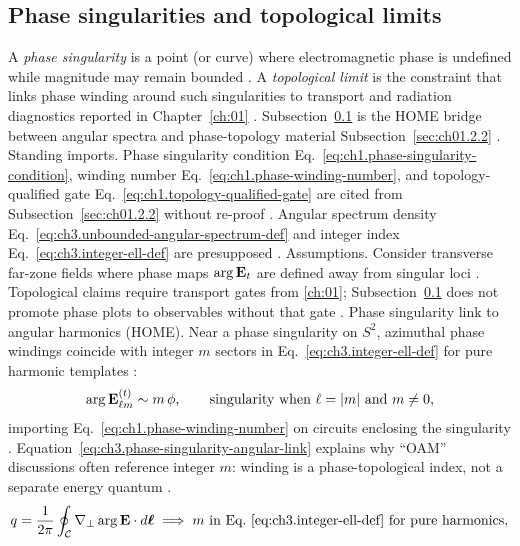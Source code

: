 \subsection{Phase singularities and topological limits}
\label{sec:ch374}
A \emph{phase singularity} is a point (or curve) where electromagnetic phase is undefined while magnitude may remain
bounded \cite{allen1992}. A \emph{topological limit} is the constraint that links phase winding
around such singularities to transport and radiation diagnostics reported in Chapter~\ref{ch:01}
\cite{stratton1941}. Subsection~\ref{sec:ch374} is the HOME bridge between angular spectra and
phase-topology material Subsection~\ref{sec:ch01.2.2} \cite{allen1992}.
Standing imports. Phase singularity condition Eq.~\eqref{eq:ch1.phase-singularity-condition}, winding number
Eq.~\eqref{eq:ch1.phase-winding-number}, and topology-qualified gate Eq.~\eqref{eq:ch1.topology-qualified-gate} are
cited from Subsection~\ref{sec:ch01.2.2} without re-proof \cite{stratton1941}. Angular spectrum density
Eq.~\eqref{eq:ch3.unbounded-angular-spectrum-def} and integer index Eq.~\eqref{eq:ch3.integer-ell-def} are presupposed
\cite{hansen1988}.
Assumptions. Consider transverse far-zone fields where phase maps \(\arg\mathbf{E}_{t}\) are defined away from singular loci
\cite{stratton1941}. Topological claims require transport gates from \ref{ch:01}; Subsection~\ref{sec:ch374}
does not promote phase plots to observables without that gate \cite{harrington2001}.
Phase singularity link to angular harmonics (HOME). Near a phase singularity on \(S^{2}\), azimuthal phase windings coincide with integer \(m\) sectors in
Eq.~\eqref{eq:ch3.integer-ell-def} for pure harmonic templates \cite{allen1992}:
\begin{equation}
\label{eq:ch3.phase-singularity-angular-link}
\arg\mathbf{E}_{\ell m}^{(t)}\sim m\,\phi,
\qquad
\text{singularity when }\ell=|m|\ \text{and }m\neq0,
\end{equation}
importing Eq.~\eqref{eq:ch1.phase-winding-number} on circuits enclosing the singularity \cite{stratton1941}.
Equation~\eqref{eq:ch3.phase-singularity-angular-link} explains why ``OAM'' discussions often reference integer \(m\):
winding is a phase-topological index, not a separate energy quantum \cite{harrington2001}.
\begin{equation}
\label{eq:ch3.topological-angular-limit}
q
=
\frac{1}{2\pi}\oint_{\mathcal{C}}\nabla_{\perp}\arg\mathbf{E}\cdot d\boldsymbol{\ell}
\;\Longrightarrow\;
m\ \text{in Eq.~\eqref{eq:ch3.integer-ell-def} for pure harmonics},
\end{equation}
